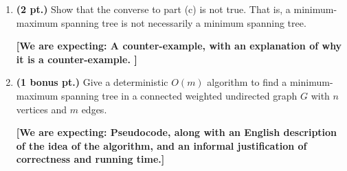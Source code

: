\documentclass{article}
\newcommand{\expecting}[1]{\noindent\textbf{[We are expecting: #1]}}
\newcommand{\pts}[1]{\textbf{(#1 pt.)}}
\begin{document}
\begin{enumerate}
\begin{enumerate}
	\expecting{ A short but formal proof. }
	\item \pts{2} Show that the converse to part (c) is not true.  That is, a minimum-maximum spanning tree is not necessarily a minimum spanning tree. 

	\expecting{ A counter-example, with an explanation of why it is a counter-example. }

	\item \pts{1 bonus} Give a deterministic $O(m)$ algorithm to find a minimum-maximum spanning tree in a connected weighted undirected graph $G$ with $n$ vertices and $m$ edges.

	\expecting{ Pseudocode, along with an English description of the idea of the algorithm, and an informal justification of correctness and running time.}
\end{enumerate}



\end{enumerate}
\end{document}
